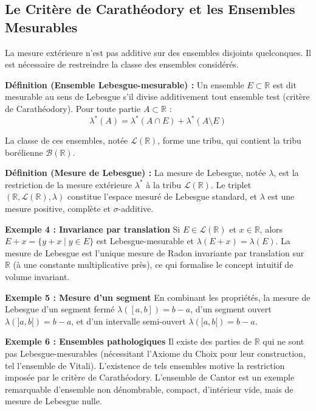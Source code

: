 \documentclass[11pt,a4paper]{article}
\begin{document}
\subsection{Le Critère de Carathéodory et les Ensembles Mesurables}

La mesure extérieure n'est pas additive sur des ensembles disjoints quelconques. Il est nécessaire de restreindre la classe des ensembles considérés.

\textbf{Définition (Ensemble Lebesgue-mesurable) :}
Un ensemble $E \subset \mathbb{R}$ est dit mesurable au sens de Lebesgue s'il divise additivement tout ensemble test (critère de Carathéodory). Pour toute partie $A \subset \mathbb{R}$ :
$$\lambda^*(A) = \lambda^*(A \cap E) + \lambda^*(A \setminus E)$$

La classe de ces ensembles, notée $\mathcal{L}(\mathbb{R})$, forme une tribu, qui contient la tribu borélienne $\mathcal{B}(\mathbb{R})$.


\textbf{Définition (Mesure de Lebesgue) :}
La mesure de Lebesgue, notée $\lambda$, est la restriction de la mesure extérieure $\lambda^*$ à la tribu $\mathcal{L}(\mathbb{R})$. Le triplet $(\mathbb{R}, \mathcal{L}(\mathbb{R}), \lambda)$ constitue l'espace mesuré de Lebesgue standard, et $\lambda$ est une mesure positive, complète et $\sigma$-additive.

\textbf{Exemple 4 : Invariance par translation}
Si $E \in \mathcal{L}(\mathbb{R})$ et $x \in \mathbb{R}$, alors $E + x = \{y + x \mid y \in E\}$ est Lebesgue-mesurable et $\lambda(E + x) = \lambda(E)$. La mesure de Lebesgue est l'unique mesure de Radon invariante par translation sur $\mathbb{R}$ (à une constante multiplicative près), ce qui formalise le concept intuitif de volume invariant.

\textbf{Exemple 5 : Mesure d'un segment}
En combinant les propriétés, la mesure de Lebesgue d'un segment fermé $\lambda([a, b]) = b - a$, d'un segment ouvert $\lambda(]a, b[) = b - a$, et d'un intervalle semi-ouvert $\lambda([a, b[) = b - a$.

\textbf{Exemple 6 : Ensembles pathologiques}
Il existe des parties de $\mathbb{R}$ qui ne sont pas Lebesgue-mesurables (nécessitant l'Axiome du Choix pour leur construction, tel l'ensemble de Vitali). L'existence de tels ensembles motive la restriction imposée par le critère de Carathéodory. L'ensemble de Cantor est un exemple remarquable d'ensemble non dénombrable, compact, d'intérieur vide, mais de mesure de Lebesgue nulle.
\end{document}
